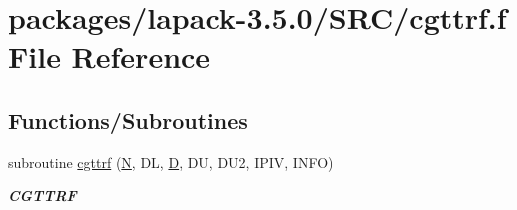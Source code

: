 \hypertarget{cgttrf_8f}{}\section{packages/lapack-\/3.5.0/\+S\+R\+C/cgttrf.f File Reference}
\label{cgttrf_8f}
\subsection*{Functions/\+Subroutines}
\begin{DoxyCompactItemize}
\item 
subroutine \hyperlink{group__complexGTcomputational_ga74d1d5397dae5f211149667ea29c36b9}{cgttrf} (\hyperlink{polmisc_8c_a0240ac851181b84ac374872dc5434ee4}{N}, D\+L, \hyperlink{odrpack_8h_a7dae6ea403d00f3687f24a874e67d139}{D}, D\+U, D\+U2, I\+P\+I\+V, I\+N\+F\+O)
\begin{DoxyCompactList}\small\item\em {\bfseries C\+G\+T\+T\+R\+F} \end{DoxyCompactList}\end{DoxyCompactItemize}
